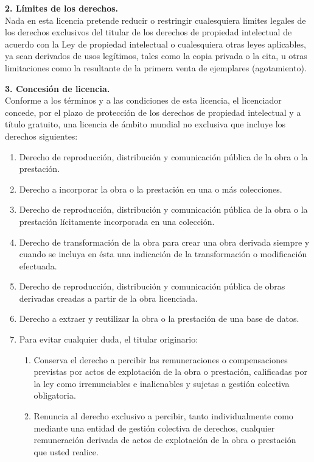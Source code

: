         \par \textbf{2. Límites de los derechos.}\\
	 Nada en esta licencia pretende reducir o restringir cualesquiera límites legales de los derechos exclusivos del titular de los derechos de propiedad intelectual de acuerdo con la Ley de propiedad intelectual o cualesquiera otras leyes aplicables, ya sean derivados de usos legítimos, tales como la copia privada o la cita, u otras limitaciones como la resultante de la primera venta de ejemplares (agotamiento).\\

        \par \textbf{3. Concesión de licencia.} \\
	Conforme a los términos y a las condiciones de esta licencia, el licenciador concede, por el plazo de protección de los derechos de propiedad intelectual y a título gratuito, una licencia de ámbito mundial no exclusiva que incluye los derechos siguientes:

        \begin{enumerate}
          \item Derecho de reproducción, distribución y comunicación pública de la obra o la prestación.
          \item Derecho a incorporar la obra o la prestación en una o más colecciones.
          \item Derecho de reproducción, distribución y comunicación pública de la obra o la prestación lícitamente incorporada en una colección.
          \item Derecho de transformación de la obra para crear una obra derivada siempre y cuando se  incluya en ésta una indicación de la transformación o modificación efectuada.
          \item Derecho de reproducción, distribución y comunicación pública de obras derivadas creadas a partir de la obra licenciada.
          \item Derecho a extraer y reutilizar la obra o la prestación de una base de datos.
	 \item Para evitar cualquier duda, el titular originario:
        \begin{enumerate}
	\item Conserva el derecho a percibir las remuneraciones o compensaciones previstas por actos de explotación de la obra o prestación, calificadas por la ley como irrenunciables e inalienables y sujetas a gestión colectiva obligatoria.
	\item Renuncia  al derecho exclusivo a percibir, tanto individualmente como mediante una entidad de gestión colectiva de derechos, cualquier remuneración derivada de actos de explotación de la obra o prestación que usted realice.
        \end{enumerate}

        \end{enumerate}

